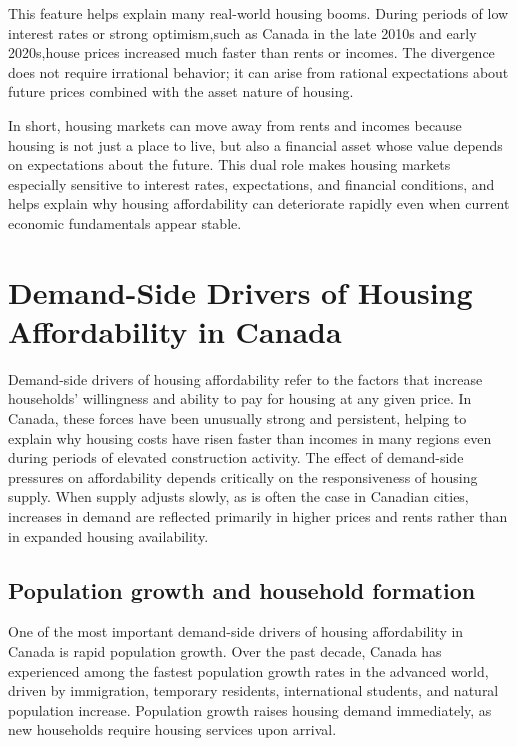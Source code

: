 \documentclass[11pt]{article}
\begin{document}
This feature helps explain many real-world housing booms. During periods of low interest rates or strong optimism,such as Canada in the late 2010s and early 2020s,house prices increased much faster than rents or incomes. The divergence does not require irrational behavior; it can arise from rational expectations about future prices combined with the asset nature of housing.

In short, housing markets can move away from rents and incomes because housing is not just a place to live, but also a financial asset whose value depends on expectations about the future. This dual role makes housing markets especially sensitive to interest rates, expectations, and financial conditions, and helps explain why housing affordability can deteriorate rapidly even when current economic fundamentals appear stable.




\section{Demand-Side Drivers of Housing Affordability in Canada}

Demand-side drivers of housing affordability refer to the factors that increase households’ willingness and ability to pay for housing at any given price. In Canada, these forces have been unusually strong and persistent, helping to explain why housing costs have risen faster than incomes in many regions even during periods of elevated construction activity. The effect of demand-side pressures on affordability depends critically on the responsiveness of housing supply. When supply adjusts slowly, as is often the case in Canadian cities, increases in demand are reflected primarily in higher prices and rents rather than in expanded housing availability.

\subsection*{Population growth and household formation}

One of the most important demand-side drivers of housing affordability in Canada is rapid population growth. Over the past decade, Canada has experienced among the fastest population growth rates in the advanced world, driven by immigration, temporary residents, international students, and natural population increase. Population growth raises housing demand immediately, as new households require housing services upon arrival.
\end{document}
